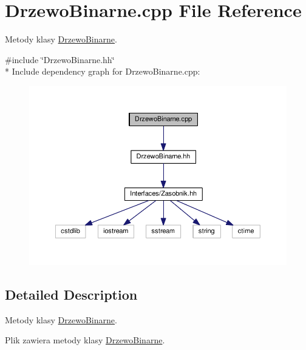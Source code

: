 \hypertarget{a00037}{}\section{Drzewo\+Binarne.\+cpp File Reference}
\label{a00037}


Metody klasy \hyperlink{a00010}{Drzewo\+Binarne}.  


{\ttfamily \#include \char`\"{}Drzewo\+Binarne.\+hh\char`\"{}}\\*
Include dependency graph for Drzewo\+Binarne.\+cpp\+:
\nopagebreak
\begin{figure}[H]
\begin{center}
\leavevmode
\includegraphics[width=350pt]{a00086}
\end{center}
\end{figure}


\subsection{Detailed Description}
Metody klasy \hyperlink{a00010}{Drzewo\+Binarne}. 

Plik zawiera metody klasy \hyperlink{a00010}{Drzewo\+Binarne}. 